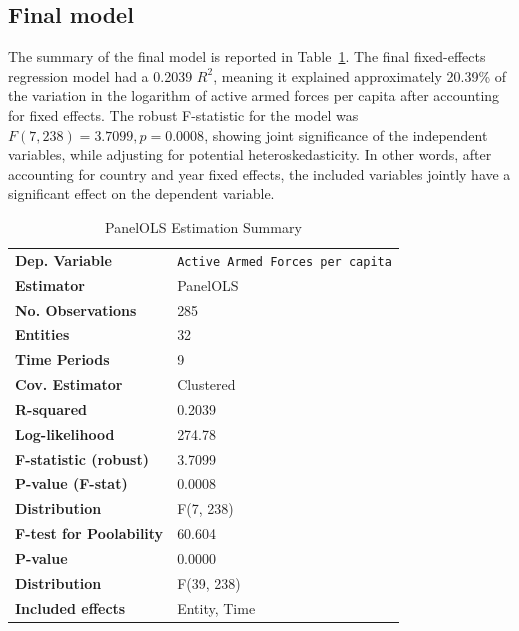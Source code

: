 \subsection{Final model}

The summary of the final model is reported in Table~\ref{tab:model_summary}.
The final fixed-effects regression model had a 0.2039 $R^2$, meaning it explained 
approximately 20.39\% of the variation in the logarithm of active armed forces per capita 
after accounting for fixed effects.
The robust F-statistic for the model was $F(7, 238)=3.7099, p=0.0008$, 
showing joint significance of the independent variables, while adjusting for potential 
heteroskedasticity.
In other words, after accounting for country and year fixed effects, 
the included variables jointly have a significant effect on the dependent variable.

\renewcommand{\arraystretch}{1.3}

\begin{table}[htbp]
\caption{PanelOLS Estimation Summary}
\centering
\begin{threeparttable}
\begin{tabularx}{\textwidth}{@{}lX@{}}
\toprule
\textbf{Dep. Variable} & \texttt{Active Armed Forces per capita} \\
\textbf{Estimator} & PanelOLS \\
\textbf{No. Observations} & 285 \\
\textbf{Entities} & 32 \\
\textbf{Time Periods} & 9 \\
\textbf{Cov. Estimator} & Clustered \\
\midrule
\textbf{R-squared} & 0.2039 \\
\textbf{Log-likelihood} & 274.78 \\
\textbf{F-statistic (robust)} & 3.7099 \\
\textbf{P-value (F-stat)} & 0.0008 \\
\textbf{Distribution} & F(7, 238) \\
\midrule
\textbf{F-test for Poolability} & 60.604 \\
\textbf{P-value} & 0.0000 \\
\textbf{Distribution} & F(39, 238) \\
\textbf{Included effects} & Entity, Time \\
\bottomrule
\end{tabularx}
\end{threeparttable}
\label{tab:model_summary}
\end{table} 

